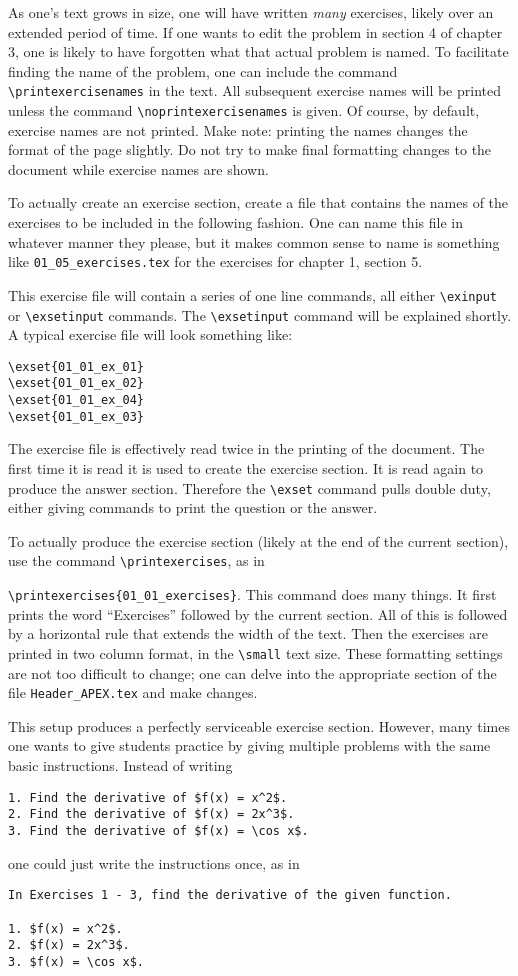 \documentclass[10pt]{article}
\begin{document}
As one's text grows in size, one will have written \textit{many} exercises, likely over an extended period of time. If one wants to edit the problem in section 4 of chapter 3, one is likely to have forgotten what that actual problem is named. To facilitate finding the name of the problem, one can include the command \verb|\printexercisenames| in the text. All subsequent exercise names will be printed unless the command \verb|\noprintexercisenames| is given. Of course, by default, exercise names are not printed. Make note: printing the names changes the format of the page slightly. Do not try to make final formatting changes to the document while exercise names are shown.

To actually create an exercise section, create a file that contains the names of the exercises to be included in the following fashion. One can name this file in whatever manner they please, but it makes common sense to name is something like \verb|01_05_exercises.tex| for the exercises for chapter 1, section 5. 

This exercise file will contain a series of one line commands, all either \verb|\exinput| or \verb|\exsetinput| commands. The \verb|\exsetinput| command will be explained shortly. A typical exercise file will look something like:
\begin{verbatim}
\exset{01_01_ex_01}
\exset{01_01_ex_02}
\exset{01_01_ex_04}
\exset{01_01_ex_03}
\end{verbatim}

The exercise file is effectively read twice in the printing of the document. The first time it is read it is used to create the exercise section. It is read again to produce the answer section. Therefore the \verb|\exset| command pulls double duty, either giving commands to print the question or the answer.

To actually produce the exercise section (likely at the end of the current section), use the command \verb|\printexercises|, as in \par \verb|\printexercises{01_01_exercises}|. This command does many things. It first prints the word ``Exercises'' followed by the current section. All of this is followed by a horizontal rule that extends the width of the text. Then the exercises are printed in two column format, in the \verb|\small| text size. These formatting settings are not too difficult to change; one can delve into the appropriate section of the file \verb|Header_APEX.tex| and make changes.

This setup produces a perfectly serviceable exercise section. However, many times one wants to give students practice by giving multiple problems with the same basic instructions. Instead of writing 
\begin{verbatim}
1. Find the derivative of $f(x) = x^2$.
2. Find the derivative of $f(x) = 2x^3$.
3. Find the derivative of $f(x) = \cos x$.
\end{verbatim}
one could just write the instructions once, as in 
\begin{verbatim}
In Exercises 1 - 3, find the derivative of the given function.

1. $f(x) = x^2$.
2. $f(x) = 2x^3$.
3. $f(x) = \cos x$.
\end{verbatim}
\end{document}
